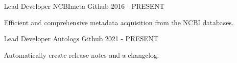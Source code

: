 

\begin{cventries}

  \cventry
    {Lead Developer} %
    {NCBImeta} %
    {Github} %
    {2016 - PRESENT} %
    {
      \begin{cvitems} %
        \item {Efficient and comprehensive metadata acquisition from the NCBI databases.}
      \end{cvitems}
    }
    
  \cventry
    {Lead Developer} %
    {Autologs} %
    {Github} %
    {2021 - PRESENT} %
    {
      \begin{cvitems} %
        \item {Automatically create release notes and a changelog.}
      \end{cvitems}
    }    

\end{cventries}
